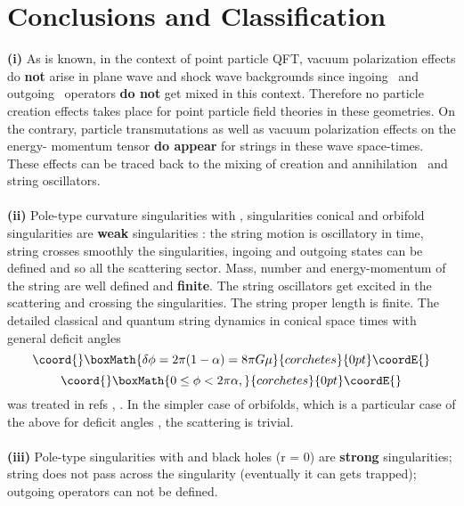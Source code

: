 \documentclass[12pt,a4paper]{article}
\begin{document}
\section{Conclusions and Classification}
{\bf (i)} As is known, in the context of point particle QFT, vacuum polarization 
effects do {\bf not} arise in plane wave and shock wave backgrounds 
since ingoing \myHighlight{$<$}\coordHE{}\, and outgoing \,\myHighlight{$>$}\coordHE{} operators {\bf do not} get mixed in 
this context. Therefore no particle creation effects takes place for point 
particle field theories in these geometries. On the contrary, particle 
transmutations as well as vacuum polarization effects on the energy-
momentum tensor {\bf do appear} for strings in these wave space-times. 
These effects can be traced back to the mixing of creation and 
annihilation \myHighlight{$<$}\coordHE{}\, and\, \myHighlight{$>$}\coordHE{} string oscillators. \\ \\ 
{\bf (ii)} Pole-type  curvature singularities with \coordHE{}, \coordHE{} 
singularities conical and orbifold singularities are {\bf weak} singularities : the string motion is oscillatory in time, string crosses smoothly the 
singularities, ingoing and outgoing states can be defined and so all the 
scattering sector. Mass, number and energy-momentum of the string are well 
defined and {\bf finite}. The string oscillators get excited in the 
scattering and crossing the singularities. The string proper length is 
finite. The detailed classical and quantum string dynamics in conical space 
times with general deficit angles
\begin{displaymath}\coord{}\boxMath{
\delta \phi = 2 \pi (1 - \alpha ) = 8\pi G\mu 
}{corchetes}{0pt}\coordE{}\end{displaymath}
\begin{displaymath}\coord{}\boxMath{
0 \le  \phi < 2\pi \alpha ,
}{corchetes}{0pt}\coordE{}\end{displaymath}
was treated in refs \cite{vs7}, \cite{vms4}. In the simpler case of orbifolds, which is a particular case 
of the above for deficit angles \coordHE{}, the scattering is trivial. \\
\\ {\bf (iii)} Pole-type singularities with \coordHE{} and black holes (r = 0) are 
{\bf strong} singularities; string does not pass across the singularity 
(eventually it can gets trapped); outgoing operators can not be defined. 
\end{document}
